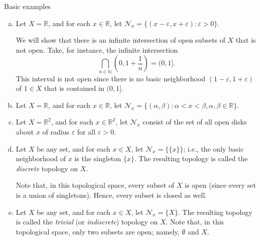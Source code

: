 \documentclass{scrartcl}
\begin{document}
\begin{example} Basic examples
\label{E:basic topological spaces}

\begin{enumerate}[(a)]

\item Let $X=\mathbb{R}$, and for each $x\in \mathbb{R}$,  let $\mathscr{N}_x=\{(x-\varepsilon , x+\varepsilon):\varepsilon >0\}$.

We will show that there is an infinite intersection of open subsets of $X$ that is not open. Take, for instance, the infinite intersection \[\bigcap\limits_{n\in \mathbb{N}}(0,1+\frac{1}{n})=(0,1]\text{.}\]
This interval is not open since there is no basic neighborhood $(1-\varepsilon,1+\varepsilon)$ of $1\in X$ that is contained in $(0,1]$.

\item Let $X=\mathbb{R}$, and for each $x\in \mathbb{R}$,  let $\mathscr{N}_x=\{(\alpha , \beta) \colon \alpha<x<\beta, \alpha,\beta\in\mathbb{R} \}$.

\item Let $X=\mathbb{R}^2$, and for each $x\in \mathbb{R}^2$, let $\mathscr{N}_x$ consist of the set of all open disks about $x$ of radius $\varepsilon$ for all $\varepsilon >0$.

\item Let $X$ be any set, and for each $x\in X$, let $\mathscr{N}_x = \{\{x\}\}$; i.e., the only basic neighborhood of $x$ is the singleton $\{x\}$. The resulting topology is called the \emph{discrete} topology on $X$.

Note that, in this topological space, every subset of $X$ is open (since every set is a union of singletons). Hence, every subset is closed as well.

\item Let $X$ be any set, and for each $x\in X$, let $\mathscr{N}_x = \{X\}$. The resulting topology is called the \emph{trivial} (or \emph{indiscrete}) topology on $X$. Note that, in this topological space, only two subsets are open; namely, $\emptyset$ and $X$.

\end{enumerate}

\end{example}
\end{document}

